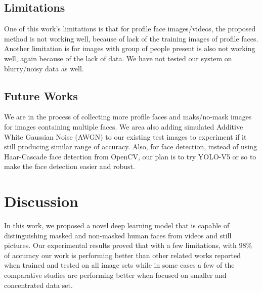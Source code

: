 \documentclass{svproc}
\begin{document}
\subsection{Limitations}

One of this work's limitations is that for profile face images/videos, the proposed method is not working well, because of lack of the training images of profile faces. Another limitation is for images with group of people present is also not working well, again because of the lack of data. We have not tested our system on blurry/noisy data as well.

\subsection{Future Works}

We are in the process of collecting more profile faces and maks/no-mask images for images containing multiple faces. We area also adding simulated Additive White Gaussian Noise (AWGN) to our existing test images to experiment if it still producing similar range of accuracy. Also, for face  detection, instead of using Haar-Cascade face detection from OpenCV, our plan is to try YOLO-V5 or so to make the face detection easier and robust.

\section{Discussion}

In this work, we proposed a novel deep learning model that is capable of distinguishing masked and non-masked human faces from videos and still pictures. Our experimental results proved that with a few limitations, with $98\%$ of accuracy our work is performing better than other related works reported when trained and tested on all image sets while in some cases a few of the comparative studies are performing better when focused on smaller and concentrated data set. 
\end{document}

